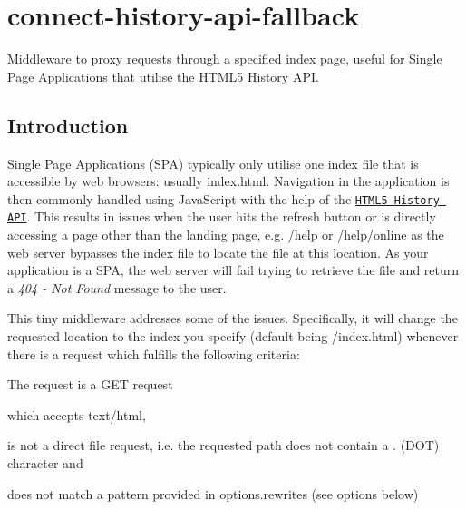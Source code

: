 \section*{connect-\/history-\/api-\/fallback}

Middleware to proxy requests through a specified index page, useful for Single Page Applications that utilise the H\+T\+M\+L5 \mbox{\hyperlink{interface_history}{History}} A\+PI.

\href{https://travis-ci.org/bripkens/connect-history-api-fallback}{\tt } \href{https://david-dm.org/bripkens/connect-history-api-fallback/master}{\tt }

\href{https://nodei.co/npm/connect-history-api-fallback/}{\tt }

\subsection*{Introduction}

Single Page Applications (S\+PA) typically only utilise one index file that is accessible by web browsers\+: usually {\ttfamily index.\+html}. Navigation in the application is then commonly handled using Java\+Script with the help of the \href{http://www.w3.org/html/wg/drafts/html/master/single-page.html#the-history-interface}{\tt H\+T\+M\+L5 History A\+PI}. This results in issues when the user hits the refresh button or is directly accessing a page other than the landing page, e.\+g. {\ttfamily /help} or {\ttfamily /help/online} as the web server bypasses the index file to locate the file at this location. As your application is a S\+PA, the web server will fail trying to retrieve the file and return a {\itshape 404 -\/ Not Found} message to the user.

This tiny middleware addresses some of the issues. Specifically, it will change the requested location to the index you specify (default being {\ttfamily /index.html}) whenever there is a request which fulfills the following criteria\+:


\begin{DoxyEnumerate}
\item The request is a G\+ET request
\item which accepts {\ttfamily text/html},
\item is not a direct file request, i.\+e. the requested path does not contain a {\ttfamily .} (D\+OT) character and
\item does not match a pattern provided in options.\+rewrites (see options below)
\end{DoxyEnumerate}

